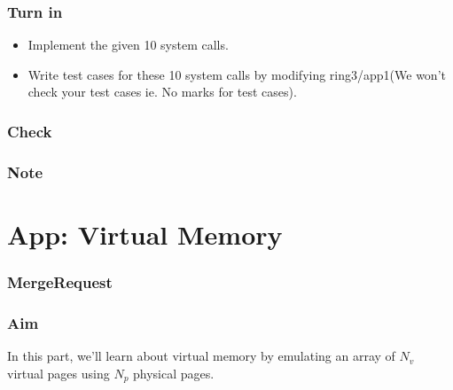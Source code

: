 \documentclass[]{book}
\newenvironment{Shaded}{}{}
\newcommand{\KeywordTok}[1]{\textbf{{#1}}}
\newcommand{\NormalTok}[1]{{#1}}
\begin{document}
\subsubsection*{Turn in}\label{turn-in-12}

\begin{itemize}
\itemsep1pt\parskip0pt
\item
  Implement the given 10 system calls.
\item
  Write test cases for these 10 system calls by modifying ring3/app1(We
  won't check your test cases ie. No marks for test cases).
\end{itemize}

\subsubsection*{Check}\label{check-12}

\subsubsection*{Note}\label{note-14}

\section{App: Virtual Memory}\label{app-virtual-memory}

\subsubsection*{MergeRequest}\label{mergerequest-13}

\begin{Shaded}
\end{Shaded}

\subsubsection*{Aim}\label{aim-13}

In this part, we'll learn about virtual memory by emulating an array of
\(N_v\) virtual pages using \(N_p\) physical pages.
\end{document}
